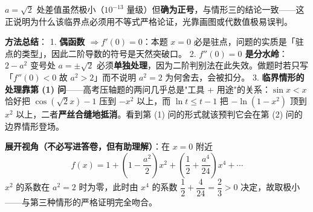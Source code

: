 \begin{answer}
$a=\sqrt2$ 处差值虽然极小（$10^{-13}$ 量级）但\textbf{确为正号}，与情形三的结论一致——这正说明为什么该临界点必须用不等式严格论证，光靠画图或代数值极易误判。

\begin{gktip}
\textbf{方法总结}：
1. \textbf{偶函数 $\Rightarrow f'(0)=0$}：本题 $x=0$ 必是驻点，问题的实质是「驻点的类型」，因此二阶导数的符号是天然突破口。
2. \textbf{$f''(0)=0$ 是分水岭}：$2-a^{2}$ 变号处 $a=\pm\sqrt2$ 必须\textbf{单独处理}，因为二阶判别法在此失效。做题时若只写「$f''(0)<0$ 故 $a^{2}>2$」而不说明 $a^{2}=2$ 为何舍去，会被扣分。
3. \textbf{临界情形的处理靠第 (1) 问}——高考压轴题的两问几乎总是"工具 + 用途"的关系：$\sin x<x$ 恰好把 $\cos\left(\sqrt2x\right)-1$ 压到 $-x^{2}$ 以上，而 $\ln t\le t-1$ 把 $-\ln\left(1-x^{2}\right)$ 顶到 $x^{2}$ 以上，二者\textbf{严丝合缝地抵消}。看到第 (1) 问的形式就该预判它会在第 (2) 问的边界情形登场。

\textbf{展开视角（不必写进答卷，但有助理解）}：在 $x=0$ 附近
\nopagebreak[4]
\[f(x)=1+\left(1-\frac{a^{2}}2\right)x^{2}+\left(\frac12+\frac{a^{4}}{24}\right)x^{4}+\cdots\]
$x^{2}$ 的系数在 $a^{2}=2$ 时为零，此时由 $x^{4}$ 的系数 $\dfrac12+\dfrac{4}{24}=\dfrac23>0$ 决定，故取极小——与第三种情形的严格证明完全吻合。
\end{gktip}



\end{answer}
